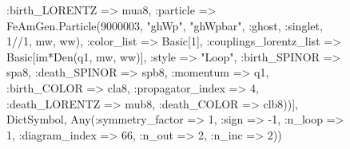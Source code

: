 \documentclass{revtex4}
\begin{document}
\begin{figure}[!htb]
\begin{center}
{:birth_LORENTZ => mua8, :particle => FeAmGen.Particle(9000003, "ghWp", "ghWpbar", :ghost, :singlet, 1//1, mw, ww), :color_list => Basic[1], :couplings_lorentz_list => Basic[im*Den(q1, mw, ww)], :style => "Loop", :birth_SPINOR => spa8, :death_SPINOR => spb8, :momentum => q1, :birth_COLOR => cla8, :propagator_index => 4, :death_LORENTZ => mub8, :death_COLOR => clb8))], Dict{Symbol, Any}(:symmetry_factor => 1, :sign => -1, :n_loop => 1, :diagram_index => 66, :n_out => 2, :n_inc => 2)) 
}
\end{center}
\end{figure}
\end{document}
